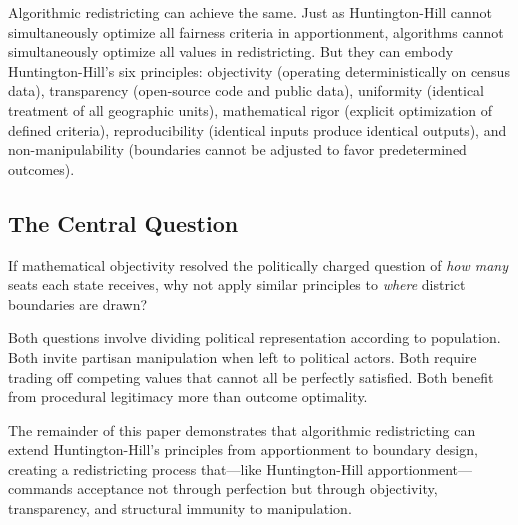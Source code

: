 Algorithmic redistricting can achieve the same. Just as Huntington-Hill cannot simultaneously optimize all fairness criteria in apportionment, algorithms cannot simultaneously optimize all values in redistricting. But they can embody Huntington-Hill's six principles: objectivity (operating deterministically on census data), transparency (open-source code and public data), uniformity (identical treatment of all geographic units), mathematical rigor (explicit optimization of defined criteria), reproducibility (identical inputs produce identical outputs), and non-manipulability (boundaries cannot be adjusted to favor predetermined outcomes).

\subsection{The Central Question}

If mathematical objectivity resolved the politically charged question of \textit{how many} seats each state receives, why not apply similar principles to \textit{where} district boundaries are drawn?

Both questions involve dividing political representation according to population. Both invite partisan manipulation when left to political actors. Both require trading off competing values that cannot all be perfectly satisfied. Both benefit from procedural legitimacy more than outcome optimality.

The remainder of this paper demonstrates that algorithmic redistricting can extend Huntington-Hill's principles from apportionment to boundary design, creating a redistricting process that—like Huntington-Hill apportionment—commands acceptance not through perfection but through objectivity, transparency, and structural immunity to manipulation.

